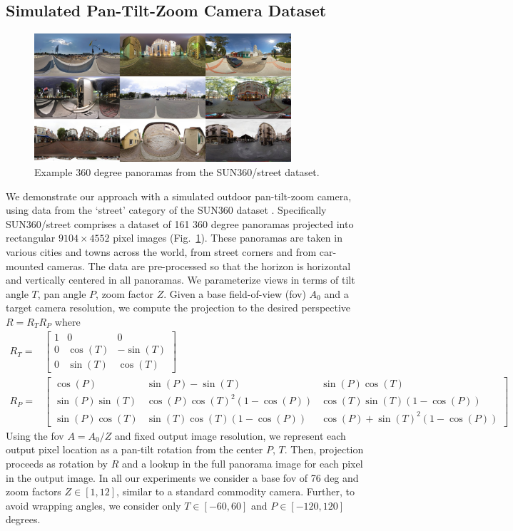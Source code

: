 \subsection{Simulated Pan-Tilt-Zoom Camera Dataset}
\begin{figure}
    \centering
    \includegraphics[width=0.85\textwidth]{figures/ptz/sun360_9x.jpg}
    \caption{Example 360 degree panoramas from the SUN360/street dataset.}
    \label{fig:sun360_ex}
\end{figure}

We demonstrate our approach with a simulated outdoor pan-tilt-zoom camera, using data from the `street' category of the SUN360 dataset \citep{SUN360}. Specifically SUN360/street comprises a dataset of 161 360 degree panoramas projected into rectangular $9104 \times 4552$ pixel images (Fig.~\ref{fig:sun360_ex}). These panoramas are taken in various cities and towns across the world, from street corners and from car-mounted cameras. The data are pre-processed so that the horizon is horizontal and vertically centered in all panoramas. We parameterize views in terms of tilt angle $T$, pan angle $P$, zoom factor $Z$. Given a base field-of-view (fov) $A_0$ and a target camera resolution, we compute the projection to the desired perspective $R = R_TR_P$ where
\begin{equation}
\begin{split}
R_T =& 
\begin{bmatrix}
1 & 0 & 0\\
0 & \cos(T) & -\sin(T)\\
0 & \sin(T) & \cos(T)
\end{bmatrix}\\
R_P =&  
\begin{bmatrix}
\cos(P)        & \sin(P) - \sin(T)            & \sin(P)\cos(T)\\
\sin(P)\sin(T) & \cos(P)\cos(T)^2(1 -\cos(P)) & \cos(T)\sin(T)(1-\cos(P))\\
\sin(P)\cos(T) & \sin(T)\cos(T)(1-\cos(P))    & \cos(P)+\sin(T)^2(1-\cos(P))
\end{bmatrix}
\end{split}
\end{equation}
Using the fov $A = A_0/Z$ and fixed output image resolution, we represent each output pixel location as a pan-tilt rotation from the center $P$, $T$. Then, projection proceeds as rotation by $R$ and a lookup in the full panorama image for each pixel in the output image. In all our experiments we consider a base fov of 76 deg and zoom factors $Z \in [1, 12]$, similar to a standard commodity camera. Further, to avoid wrapping angles, we consider only $T \in [-60, 60]$ and $P \in [-120, 120]$ degrees.

